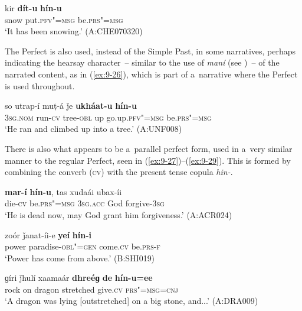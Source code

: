 \begin{exe}
\ex
\label{ex:9-25}
\gll kir \textbf{dít-u} \textbf{hín-u} \\
snow put.\textsc{pfv"=msg} be.\textsc{prs"=msg} \\
\glt `It has been snowing.' (A:CHE070320)
\end{exe}

The Perfect is also used, instead of the Simple Past, in some narratives, perhaps indicating the hearsay character~-- similar to the use of \textit{maní} (see )~-- of the narrated content, as in (\ref{ex:9-26}), which is part of a~narrative where the Perfect is used throughout.

\begin{exe}
\ex
\label{ex:9-26}
\gll so utrap-í muṭ-á ǰe \textbf{ukháat-u} \textbf{hín-u} \\
\textsc{3sg.nom} run-\textsc{cv} tree-\textsc{obl} up go.up.\textsc{pfv"=msg} be.\textsc{prs"=msg} \\
\glt `He ran and climbed up into a tree.' (A:UNF008) 
\end{exe}

There is also what appears to be a~parallel perfect form, used in a~very similar manner to the regular Perfect, seen in (\ref{ex:9-27})--(\ref{ex:9-29}). This is formed by combining the converb (\textsc{cv}) with the present tense copula \textit{hin-}.

\begin{exe}
\ex
\label{ex:9-27}
\gll \textbf{mar-í} \textbf{hín-u}, tas xudaái ubax-íi \\
die-\textsc{cv} be.\textsc{prs"=msg} \textsc{3sg.acc} God forgive-\textsc{3sg} \\
\glt `He is dead now, may God grant him forgiveness.' (A:ACR024)

\ex
\label{ex:9-28}
\gll zoór ǰanat-íi-e \textbf{yeí} \textbf{hín-i} \\
power paradise-\textsc{obl"=gen} come.\textsc{cv} be.\textsc{prs-f} \\
\glt `Power has come from above.' (B:SHI019)

\ex
\label{ex:9-29}
\gll ɡíri ǰhulí xaamaár \textbf{dhreéɡ} \textbf{de} \textbf{hín-u=ee} \\
rock on dragon stretched give.\textsc{cv} \textsc{prs"=msg=cnj} \\
\glt `A dragon was lying [outstretched] on a big stone, and...' (A:DRA009)
\end{exe}


